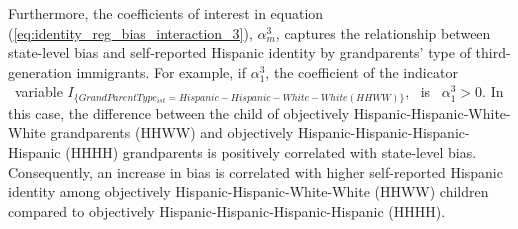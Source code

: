 \documentclass[12pt, fullpage]{article}
\begin{document}
Furthermore, the coefficients of interest in equation (\ref{eq:identity_reg_bias_interaction_3}), $\alpha_m^3$, captures the relationship between state-level bias and self-reported Hispanic identity by grandparents' type of third-generation immigrants. For example, if $\alpha_1^3$, the coefficient of the indicator ~variable \newline $I_{\{GrandParentType_{ist} = Hispanic-Hispanic-White-White (HHWW)\}}$, ~is ~$\alpha_1^3 > 0$. In this case, the difference between the child of objectively Hispanic-Hispanic-White-White grandparents (HHWW) and objectively Hispanic-Hispanic-Hispanic-Hispanic (HHHH) grandparents is positively correlated with state-level bias. Consequently, an increase in bias is correlated with higher self-reported Hispanic identity among objectively Hispanic-Hispanic-White-White (HHWW) children compared to objectively Hispanic-Hispanic-Hispanic-Hispanic (HHHH). 
\end{document}
